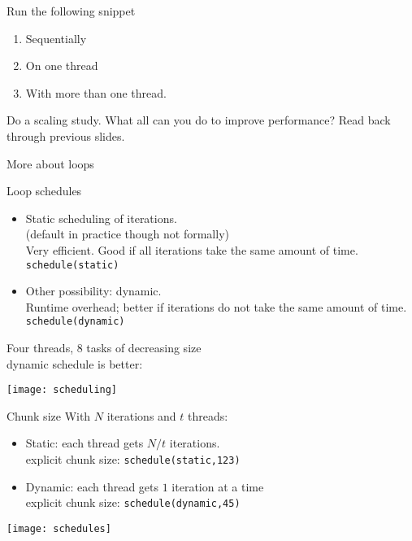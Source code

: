 \begin{exerciseframe}
  
\end{exerciseframe}

\begin{exerciseframe}[vectorsum]
  Run the following snippet
  \begin{enumerate}
  \item Sequentially
  \item On one thread
  \item With more than one thread.
  \end{enumerate}
  Do a scaling study.
  What all can you do to improve performance? Read back through previous slides.
\end{exerciseframe}

 {More about loops}

\begin{numberedframe}{Loop schedules}
  \begin{itemize}
  \item Static scheduling of iterations. \\
    (default in practice though not formally)\\
    Very efficient. Good if all iterations take the same amount of
    time.\\ \texttt{schedule(static)}
  \item Other possibility: dynamic.\\
    Runtime overhead; better if iterations do not take the same amount
    of time.\\
    \texttt{schedule(dynamic)}
  \end{itemize}

  Four threads, 8 tasks of decreasing size\\
  dynamic schedule is better:
  
  \texttt{[image: scheduling]}
\end{numberedframe}

\begin{numberedframe}{Chunk size}
\small
  With $N$ iterations and $t$ threads:
  \begin{itemize}
  \item Static: each thread gets $N/t$ iterations.\\
    explicit chunk size: \texttt{schedule(static,123)}
  \item Dynamic: each thread gets $1$ iteration at a time\\
    explicit chunk size: \texttt{schedule(dynamic,45)}\\
  \end{itemize}
  \texttt{[image: schedules]}
\end{numberedframe}

